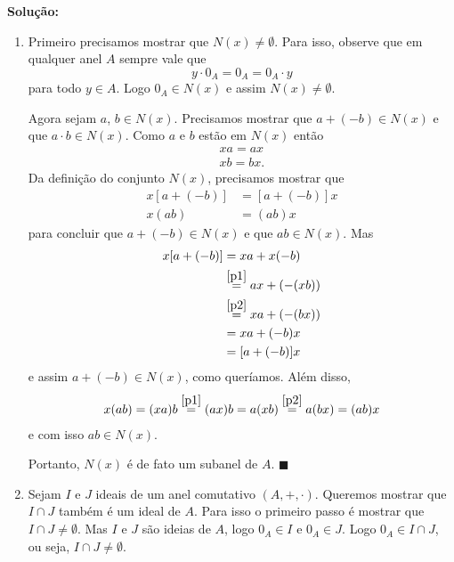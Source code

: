 \documentclass[12pt]{exam}
\renewcommand{\qedsymbol}{$\blacksquare$}
\begin{document}
    \noindent\textbf{Solu\c{c}\~ao:}
    \begin{enumerate}[label=({\arabic*})]
        \item Primeiro precisamos mostrar que $N(x) \ne \emptyset$. Para isso, observe que em qualquer anel $A$ sempre vale que
            \[ y \cdot 0_A = 0_A = 0_A\cdot y\]
        para todo $y \in A$. Logo $0_A \in N(x)$ e assim $N(x) \ne \emptyset$.

        Agora sejam $a$, $b \in N(x)$. Precisamos mostrar que $a + (-b)\in N(x)$ e que $a\cdot b \in N(x)$. Como $a$ e $b$ estão em $N(x)$
        então
        \begin{align}
            xa = ax\label{p1}\\
            xb = bx\label{p2}.
        \end{align}
        Da definição do conjunto $N(x)$, precisamos mostrar que
        \begin{align*}
            x[a + (-b)] &= [a + (-b)]x\\
            x(ab) &= (ab)x
        \end{align*}
        para concluir que $a + (-b) \in N(x)$ e que $ab \in N(x)$. Mas
        \begin{align*}
            x[a + (-b)] &= xa + x(-b) \\ &\stackrel{\eqref{p1}}{=} ax + (-(xb)) \\ &\stackrel{\eqref{p2}}{=} xa + (-(bx)) \\ &= xa + (-b)x \\ &= [a + (-b)]x
        \end{align*}
        e assim $a + (-b) \in N(x)$, como queríamos. Além disso,
        \begin{align*}
            x(ab) = (xa)b \stackrel{\eqref{p1}}{=} (ax)b = a(xb) \stackrel{\eqref{p2}}{=} a(bx) = (ab)x
        \end{align*}
        e com isso $ab \in N(x)$.

        Portanto, $N(x)$ é de fato um subanel de $A$. \hspace{.1cm} \qedsymbol
        \item Sejam $I$ e $J$ ideais de um anel comutativo $(A, +, \cdot)$. Queremos mostrar que $I \cap J$ também é um ideal de $A$. Para
            isso o primeiro passo é mostrar que $I \cap J \ne \emptyset$. Mas $I$ e $J$ são ideias de $A$, logo $0_A \in I$ e $0_A \in J$.
            Logo $0_A \in I \cap J$, ou seja, $I \cap J \ne \emptyset$.


\end{enumerate}
\end{document}
